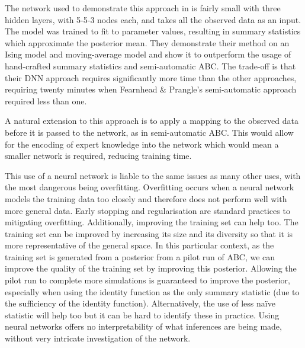 \documentclass[11pt,a4paper]{article}
\theoremstyle{break}
\begin{document}
  \par The network used to demonstrate this approach in \cite[]{learning_summary_statistics_for_abc_via_dnn} is fairly small with three hidden layers, with 5-5-3 nodes each, and takes all the observed data as an input. The model was trained to fit to parameter values, resulting in summary statistics which approximate the posterior mean. They demonstrate their method on an Ising model and moving-average model and show it to outperform the usage of hand-crafted summary statistics and semi-automatic ABC. The trade-off is that their DNN approach requires significantly more time than the other approaches, requiring twenty minutes when Fearnhead \& Prangle's semi-automatic approach required less than one.

  \par A natural extension to this approach is to apply a mapping to the observed data before it is passed to the network, as in semi-automatic ABC. This would allow for the encoding of expert knowledge into the network which would mean a smaller network is required, reducing training time.

  \par This use of a neural network is liable to the same issues as many other uses, with the most dangerous being overfitting. Overfitting occurs when a neural network models the training data too closely and therefore does not perform well with more general data. Early stopping and regularisation are standard practices to mitigating overfitting. Additionally, improving the training set can help too. The training set can be improved by increasing its size and its diversity so that it is more representative of the general space. In this particular context, as the training set is generated from a posterior from a pilot run of ABC, we can improve the quality of the training set by improving this posterior. Allowing the pilot run to complete more simulations is guaranteed to improve the posterior, especially when using the identity function as the only summary statistic (due to the sufficiency of the identity function). Alternatively, the use of less na\"ive statistic will help too but it can be hard to identify these in practice. Using neural networks offers no interpretability of what inferences are being made, without very intricate investigation of the network.


\end{document}
